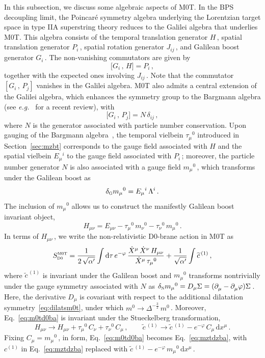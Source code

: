 \documentclass[11pt]{article}
\newcommand{\be}{\begin{equation}}
\newcommand{\ee}{\end{equation}}
\newcommand{\p}{\partial}
\renewcommand{\tilde}[1]{\widetilde{#1}}
\renewcommand{\emph}[1]{\textit{#1}}
\newcommand{\dd}{\mathrm{d}}
\begin{document}
In this subsection, we discuss some algebraic aspects of M0T. 
In the BPS decoupling limit, the Poincar\'e symmetry algebra underlying the Lorentzian target space in type IIA superstring theory reduces to the Galilei algebra that underlies M0T.
This algebra consists of the temporal translation generator $H$\,, spatial translation generator $P^{}_i$\,, spatial rotation generator $J^{}_{ij}$\,, and Galilean boost generator $G^{}_i$\,. The non-vanishing commutators are given by
%
\be \label{eq:ghp}
    \bigl[ G_i\,, \, H \bigr] = P_i\,, 
\ee
%
together with the expected ones involving $J_{ij}$\,. Note that the commutator $[G_i\,, \, P_j]$ vanishes in the Galilei algebra. M0T also admits a central extension of the Galilei algebra, which enhances the symmetry group to the Bargmann algebra (see \emph{e.g.}~\cite{Bergshoeff:2022eog} for a recent review), with
%
\be \label{eq:cen}
    \bigl[ G_i \,, \, P_j \bigr] = N \, \delta_{ij}\,,
\ee
%
where $N$ is the generator associated with particle number conservation. Upon gauging of the Bargmann algebra~\cite{Andringa:2010it}, the temporal vielbein $\tau_\mu{}^0$ introduced in Section~\ref{sec:mzbt} corresponds to the gauge field associated with $H$ and the spatial vielbein $E_\mu{}^i$ to the gauge field associated with $P_i$\,; moreover, the particle number generator $N$ is also associated with a gauge field $m_\mu{}^0$\,, which transforms under the Galilean boost as
%
\be \label{eq:gel}
    \delta_\text{\scalebox{0.8}{G}} m_\mu{}^0 = E_\mu{}^i \, \Lambda^i\,. 
\ee
%
The inclusion of $m_\mu{}^0$ allows us to construct the manifestly Galilean boost invariant object,
%
\be \label{eq:hetm}
    H^{}_{\mu\nu} = E^{}_{\mu\nu} - \tau^{}_\mu{}^0 \, m^{}_\nu{}^0 - \tau^{}_\nu{}^0 \, m^{}_\mu{}^0\,.
\ee
%
In terms of $H_{\mu\nu}$\,, we write the non-relativistic D0-brane action in M0T as
%
\be \label{eq:m0td0ba}
    S^\text{\scalebox{0.8}{M0T}}_\text{\scalebox{0.8}{D0}} =  \frac{1}{2 \, \sqrt{\alpha'}} \int \dd\tau \, e^{-\varphi} \, \frac{\dot{X}^\mu \, \dot{X}^\nu \, H_{\mu\nu}}{\dot{X}^\mu \, \tau_\mu{}^0} + \frac{1}{\sqrt{\alpha'}} \int {\tilde{c}}^{\,(1)}\,,
\ee
%
where ${\tilde{c}}^{\,(1)}$ is invariant under the Galilean boost and $m^{}_\mu{}^0$ transforms nontrivially under the gauge symmetry associated with $N$ as $\delta_\text{\scalebox{0.8}{N}} m_\mu{}^0 = D_\mu \Sigma = (\p^{}_\mu - \p^{}_\mu \varphi) \Sigma$\,. Here, the derivative $D_\mu$ is covariant with respect to the additional dilatation symmetry~\eqref{eq:dilatsm0t}, under which $m^0 \rightarrow \Delta^{-\frac{3}{2}} \, m^0$\,. 
Moreover, Eq.~\eqref{eq:m0td0ba} is invariant under the Stueckelberg  transformation, 
%
\be
    H^{}_{\mu\nu} \rightarrow H^{}_{\mu\nu} + \tau^{}_\mu{}^0 \, C^{}_\nu + \tau^{}_\nu{}^0 \, C^{}_\mu\,,
        \qquad%
    \tilde{c}\,^{(1)} \rightarrow \tilde{c}\,^{(1)} - e^{-\varphi} \, C^{}_\mu \, \dd x^\mu\,.
\ee
%
Fixing $C^{}_\mu = m^{}_\mu{}^0$\,, in form, Eq.~\eqref{eq:m0td0ba} becomes Eq.~\eqref{eq:mztdzba}, with $c^{(1)}$ in Eq.~\eqref{eq:mztdzba} replaced with $\tilde{c}\,^{(1)} - e^{-\varphi} \, m^{}_\mu{}^0 \, \dd x^\mu$\,. 
\end{document}
